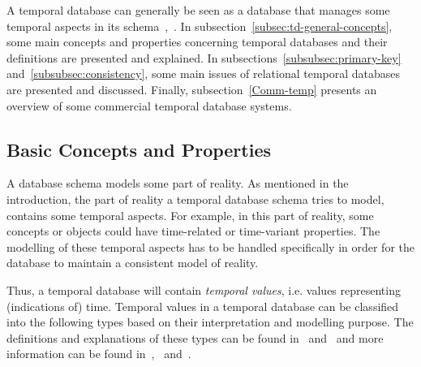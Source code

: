 %
%
A temporal database can generally be seen as a database that manages some temporal aspects in its schema~\cite{etzion1998},~\cite{Billiet:Pons:Matthe:DeTre:Pons:2011:BipolarFuzzy}. In subsection~\ref{subsec:td-general-concepts}, some main concepts and properties concerning temporal databases and their definitions are presented and explained. In subsections~\ref{subsubsec:primary-key} and~\ref{subsubsec:consistency}, some main issues of relational temporal databases are presented and discussed. Finally, subsection~\ref{Comm-temp} presents an overview of some commercial temporal database systems.

\subsection{\label{subsec:td-general-concepts}Basic Concepts and Properties}
A database schema models some part of reality. As mentioned in the introduction, the part of reality a temporal database schema tries to model, contains some temporal aspects. For example, in this part of reality, some concepts or objects could have time-related or time-variant properties. The modelling of these temporal aspects has to be handled specifically in order for the database to maintain a consistent model of reality.

Thus, a temporal database will contain \emph{temporal values}, i.e. values representing (indications of) time. Temporal values in a temporal database can be classified into the following types based on their interpretation and modelling purpose. The definitions and explanations of these types can be found in~\cite{Dyreson1994} and~\cite{Nascimento95decisiontime} and more information can be found in~\cite{Jensen:1991:IIM:627283.627484},~\cite{Snodgrass:1984:TQL:588011.588041} and~\cite{Nascimento95decisiontime}.


